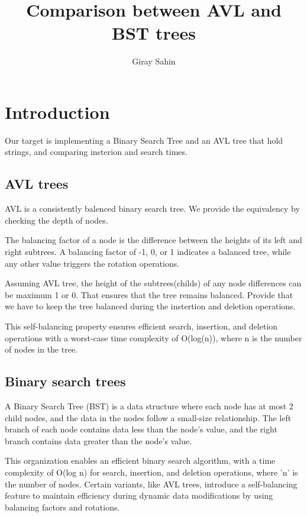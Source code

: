 \documentclass{article}
\title{Comparison between AVL and BST trees }
\author{Giray Sahin}
\begin{document}
\maketitle
\section{Introduction}
Our target is implementing a Binary Search Tree and an AVL tree that hold strings, and comparing insterion and search times.



\subsection{AVL trees}
AVL is a consistently balenced binary search tree. We provide the equivalency by checking the depth of nodes. 

The balancing factor of a node is the difference between the heights of its left and right subtrees. A balancing factor of -1, 0, or 1 indicates a balanced tree, while any other value triggers the rotation operations.

Assuming AVL tree, the height of the subtrees(childs) of any node differences can be maximum 1 or 0. That ensures that the tree remains balanced. Provide that we have to keep the tree balanced during the instertion and deletion operations. 

This self-balancing property ensures efficient search, insertion, and deletion operations with a worst-case time complexity of O(log(n)), where n is the number of nodes in the tree.

\subsection{Binary search trees}

    A Binary Search Tree (BST) is a data structure where each node has at most 2 child nodes, and the data in the nodes follow a small-size relationship. The left branch of each node contains data less than the node's value, and the right branch contains data greater than the node's value. 

This organization enables an efficient binary search algorithm, with a time complexity of O(log n) for search, insertion, and deletion operations, where 'n' is the number of nodes. Certain variants, like AVL trees, introduce a self-balancing feature to maintain efficiency during dynamic data modifications by using balancing factors and rotations. 
\end{document}
